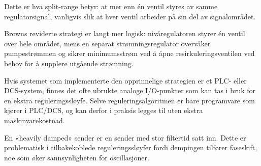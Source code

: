 \vskip 10pt

Dette er hva split-range betyr: at mer enn én ventil styres av samme regulatorsignal, vanligvis slik at hver ventil arbeider på sin del av signalområdet.

\vskip 10pt

Browns reviderte strategi er langt mer logisk: nivåregulatoren styrer én ventil over hele området, mens en separat strømningsregulator overvåker pumpestrømmen og sikrer minimumsstrøm ved å åpne resirkuleringsventilen ved behov for å supplere utgående strømning.

\vskip 10pt

Hvis systemet som implementerte den opprinnelige strategien er et PLC- eller DCS-system, finnes det ofte ubrukte analoge I/O-punkter som kan tas i bruk for en ekstra reguleringssløyfe. Selve reguleringsalgoritmen er bare programvare som kjører i PLC/DCS, og kan derfor i praksis legges til uten ekstra maskinvarekostnad.

\vskip 10pt

En «heavily damped» sender er en sender med stor filtertid satt inn. Dette er problematisk i tilbakekoblede reguleringssløyfer fordi dempingen tilfører faseskift, noe som øker sannsynligheten for oscillasjoner.


